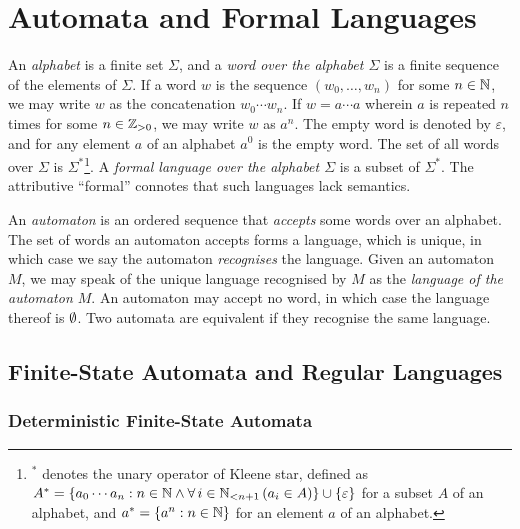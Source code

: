 


\usepackage{tikz}
\usetikzlibrary{automata,decorations.markings}
\newcommand*{\pt}{5mm}


\section{Automata and Formal Languages}

An \emph{alphabet} is a finite set \(\Sigma\), and a \emph{word over the alphabet \(\Sigma\)} is a finite sequence of
the elements of \(\Sigma\). If a word \(w\) is the sequence \((w_0, \ldots, w_n)\) for some \(n \in \setnat\), we may
write \(w\) as the concatenation \(w_0 \cdots w_n\). If \(w = a \cdots a\) wherein \(a\) is repeated \(n\) times for
some \(n \in \posint\), we may write \(w\) as \(a^n\). The empty word is denoted by \(\varepsilon\), and for any element
\(a\) of an alphabet \(a^0\) is the empty word. The set of all words over \(\Sigma\) is \(\Sigma^*\)\footnote{\(^*\)
denotes the unary operator of Kleene star, defined as \(A^* = \set{a_0 \cdots a_n : n \in \setnat
\land \forall \, i \in \Nln[n + 1] \, (a_i \in A)} \cup \set{\varepsilon}\) for a subset \(A\) of an alphabet, and
\(a^* = \set{a^n : n \in \setnat}\) for an element \(a\) of an alphabet.}. A \emph{formal language over the alphabet
\(\Sigma\)} is a subset of \(\Sigma^*\).  The attributive ``formal'' connotes that such languages lack semantics.

An \emph{automaton} is an ordered sequence that \emph{accepts} some words over an alphabet. The set of words an
automaton accepts forms a language, which is unique, in which case we say the automaton \emph{recognises} the language.
Given an automaton \(M\), we may speak of the unique language recognised by \(M\) as the \emph{language of the automaton
\(M\)}. An automaton may accept no word, in which case the language thereof is \(\nset\). Two automata are equivalent if
they recognise the same language.

\subsection{Finite-State Automata and Regular Languages}

\subsubsection{Deterministic Finite-State Automata}

